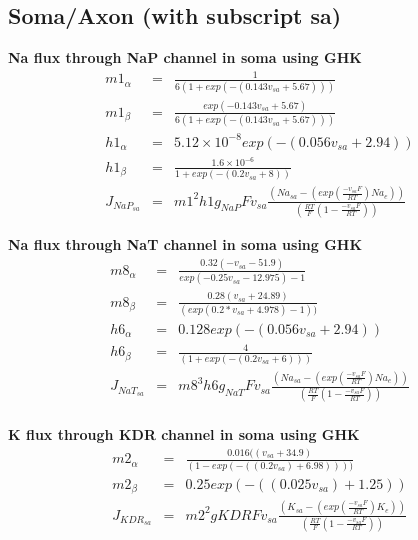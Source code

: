 \documentclass[fleqn]{report}
\numberwithin{equation}{section}
\numberwithin{equation}{section}
\begin{document}
\subsection{Soma/Axon (with subscript sa)}			
\textbf{Na flux through NaP channel in soma using GHK}
\begin{eqnarray}
	            m1_{\alpha}     &=& \frac{1}{6 (1 + exp(-(0.143  v_{sa} + 5.67)))}\\ %
	            m1_{\beta}     & =& \frac{exp(-0.143  v_{sa} + 5.67)}{ 6 (1 + exp(-(0.143  v_{sa} + 5.67)))}\\
	            h1_{\alpha}     &=&  5.12 \times 10^{-8} exp(-(0.056  v_{sa} + 2.94))\\
	            h1_{\beta}      &=& \frac{1.6 \times 10^{-6}}{1 + exp(-(0.2  v_{sa} + 8))}\\
	            J_{NaP_{sa}}    &=& m1^2  h1 g_{NaP} F v_{sa}  \frac{(Na_{sa} - (exp(\frac{-v_{sa} F}{RT})  Na_e))}{(\frac{RT}{F} (1 - \frac{-v_{sa} F}{RT}))}
\end{eqnarray}

%	
\textbf{ Na flux through NaT channel in soma using GHK}
\begin{eqnarray}
	            m8_{\alpha}     &=& \frac{0.32  (-v_{sa} - 51.9)}{exp(-0.25  v_{sa} - 12.975) - 1}\\ %
	            m8_{\beta}      &=& \frac{0.28 (v_{sa} + 24.89)}{(exp(0.2 * v_{sa} + 4.978) - 1))}\\ %
	            h6_{\alpha}     &=& 0.128  exp(-(0.056  v_{sa} + 2.94))\\
	            h6_{\beta}      &=&\frac{4}{(1 + exp(-(0.2  v_{sa} + 6)))}\\
	            J_{NaT_{sa}}    &=& m8^3  h6 g_{NaT} F v_{sa} \frac{(Na_{sa} - (exp(\frac{-v_{sa} F}{RT})  Na_e))}{(\frac{RT}{F} (1 - \frac{-v_{sa} F}{RT}))}\\
\end{eqnarray}
           
 \textbf{K flux through KDR channel in soma using GHK}
 \begin{eqnarray}
	            m2_{\alpha}     &=& \frac{0.016 ((v_{sa} + 34.9)}{(1 - exp(-((0.2  v_{sa}) + 6.98))))}\\
	            m2_{\beta}      &=& 0.25 exp(-((0.025  v_{sa}) + 1.25))\\
	            J_{KDR_{sa}}    &=& m2^2 g{KDR} F v_{sa} \frac{(K_{sa} - (exp(\frac{-v_{sa} F}{RT})  K_e))}{(\frac{RT}{F} (1 - \frac{-v_{sa} F}{RT}))}\\
\end{eqnarray}
\end{document}
